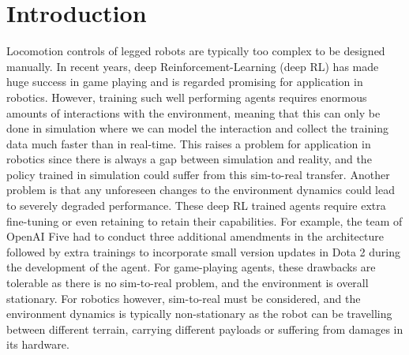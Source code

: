 
\section{Introduction}
Locomotion controls of legged robots are typically too complex to be designed manually.
In recent years, deep Reinforcement-Learning (deep RL) has made huge success in game playing
\cite{alphaGo, alphaStar} and is regarded promising for application in robotics. However, training such well performing agents requires enormous amounts of interactions with the environment, meaning that this can only 
be done in simulation where we can model the interaction and collect the training data much faster than in real-time. This raises a problem for application in robotics since there is always a gap between simulation and reality, and the policy trained in simulation could suffer from this sim-to-real transfer. Another problem is that any unforeseen changes to the environment dynamics could lead to severely degraded performance. These deep RL trained agents require extra fine-tuning or even retaining to retain their capabilities.
For example, the team of OpenAI Five \cite{openAI5} had to conduct three additional amendments in the architecture followed by extra trainings to incorporate small version updates in Dota 2 during the development of the agent.
For game-playing agents, these drawbacks are tolerable as there is no sim-to-real problem, and the environment is overall stationary. For robotics however, sim-to-real must be considered, and the environment dynamics is typically non-stationary as the robot can be travelling between different terrain, carrying different payloads or suffering from damages in its hardware.



